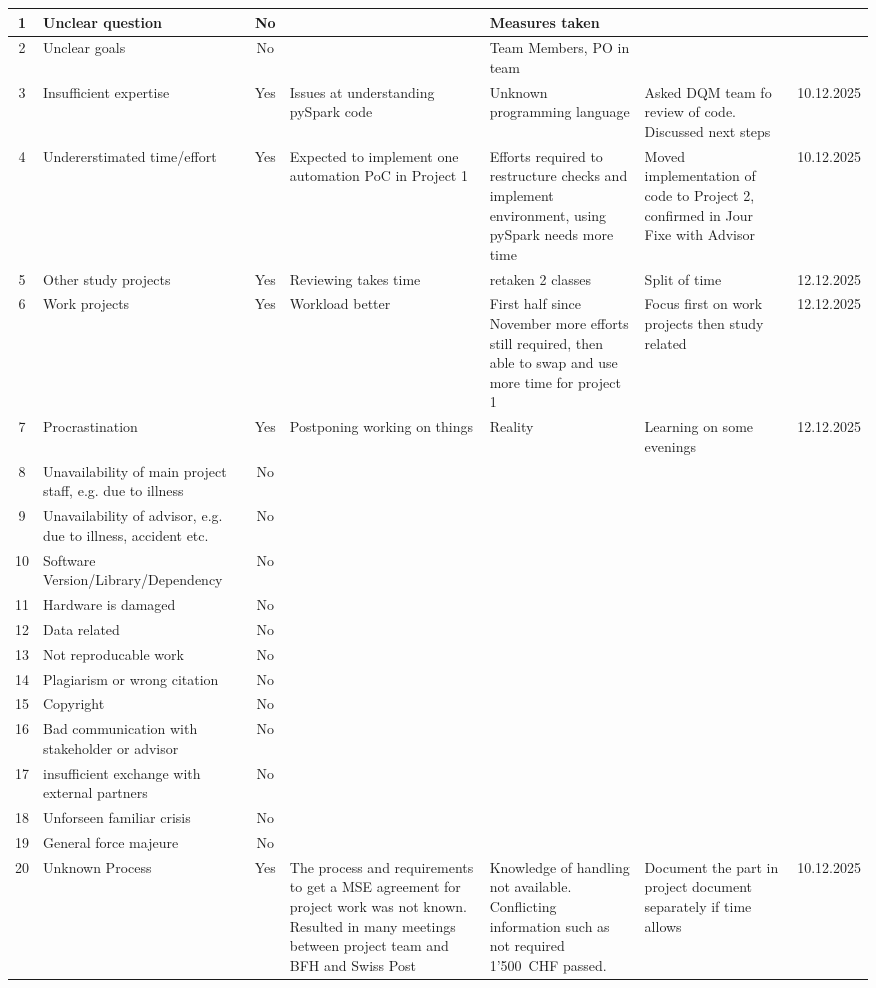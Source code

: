 \begin{landscape}
\begin{longtable}{|c|p{4cm}|c|p{3cm}|p{3cm}|p{3cm}|c|}
1  & Unclear question & No  &  & Measures taken &  &  \\ \hline
2  & Unclear goals & No  &  & Team Members, PO in team &  &  \\ \hline
3  & Insufficient expertise & Yes & Issues at understanding pySpark code & Unknown programming language & Asked DQM team fo review of code. Discussed next steps & 10.12.2025 \\ \hline
4  & Undererstimated time/effort & Yes & Expected to implement one automation PoC in Project 1 & Efforts required to restructure checks and implement environment, using pySpark needs more time & Moved implementation of code to Project 2, confirmed in Jour Fixe with Advisor & 10.12.2025 \\ \hline
5  & Other study projects & Yes & Reviewing takes time & retaken 2 classes & Split of time & 12.12.2025 \\ \hline
6  & Work projects & Yes & Workload better & First half since November more efforts still required, then able to swap and use more time for project 1 & Focus first on work projects then study related & 12.12.2025 \\ \hline
7  & Procrastination & Yes & Postponing working on things & Reality & Learning on some evenings & 12.12.2025 \\ \hline
8  & Unavailability of main project staff, e.g. due to illness & No &  &  &  &  \\ \hline
9  & Unavailability of advisor, e.g. due to illness, accident etc. & No &  &  &  &  \\ \hline
10 & Software Version/Library/Dependency & No &  &  &  &  \\ \hline
11 & Hardware is damaged & No &  &  &  &  \\ \hline
12 & Data related & No &  &  &  &  \\ \hline
13 & Not reproducable work & No &  &  &  &  \\ \hline
14 & Plagiarism or wrong citation & No &  &  &  &  \\ \hline
15 & Copyright & No &  &  &  &  \\ \hline
16 & Bad communication with stakeholder or advisor & No &  &  &  &  \\ \hline
17 & insufficient exchange with external partners & No &  &  &  &  \\ \hline
18 & Unforseen familiar crisis & No &  &  &  &  \\ \hline
19 & General force majeure & No &  &  &  &  \\ \hline
20 & Unknown Process & Yes & The process and requirements to get a MSE agreement for project work was not known. Resulted in many meetings between project team and BFH and Swiss Post & Knowledge of handling not available. Conflicting information such as not required 1'500~CHF passed. & Document the part in project document separately if time allows & 10.12.2025 \\ \hline

\end{longtable}
\end{landscape}


